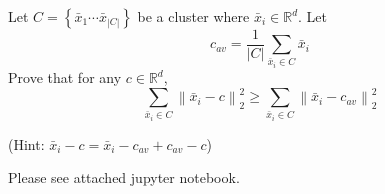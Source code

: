 \documentclass[11pt]{article}
\newenvironment{problem}[2][Problem]{\begin{trivlist}
\item[\hskip \labelsep {\bfseries #1}\hskip \labelsep {\bfseries #2.}]}{\end{trivlist}}
\begin{document}
\begin{problem}{3. (15 points)}
Let $C = \left \lbrace \bar{x}_1 \cdots \bar{x}_{|C|} \right \rbrace$ be a cluster where $\bar{x}_i \in \mathbb{R}^d$. Let 
\[ c_{av} = \frac{1}{|C|} \sum\limits_{\bar{x}_i \in C} \bar{x}_i \] 
Prove that for any $c \in \mathbb{R}^d$,
\[ \sum\limits_{\bar{x}_i \in C} \left \lVert \bar{x}_i - c \right \rVert_2^2 \geq \sum\limits_{\bar{x}_i \in C} \left \lVert \bar{x}_i - c_{av} \right \rVert_2^2 \]

(Hint: $\bar{x}_i - c = \bar{x}_i - c_{av} + c_{av} -c$)
\end{problem} 

\begin{problem}{4. (30 points)}
Please see attached jupyter notebook.
\end{problem}
\end{document}
